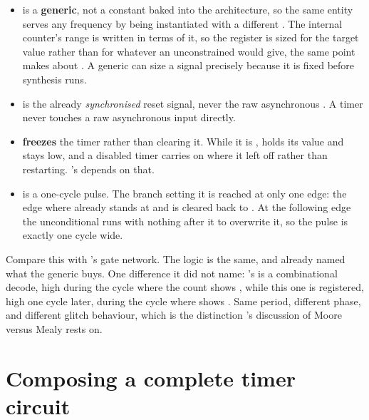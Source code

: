 \begin{itemize}
  \item {} is a \textbf{generic}, not a constant baked into the architecture, so the
    same entity serves any frequency by being instantiated with a different . The
    internal counter's range is written in terms of it, so the register is sized for the target value
    rather than for whatever an unconstrained  would give, the same point
     makes about . A generic can size a signal
    precisely because it is fixed before synthesis runs.
  \item {} is the already \emph{synchronised} reset signal, never the raw
    asynchronous . A timer never touches a raw asynchronous input directly.
  \item {} \textbf{freezes} the timer rather than clearing it. While it is ,
     holds its value and  stays low, and a disabled timer carries on
    where it left off rather than restarting. 's  depends on that.
  \item {} is a one-cycle pulse. The  branch setting it is reached at only
    one edge: the edge where  already stands at  and is cleared back
    to . At the following edge the unconditional  runs with nothing
    after it to overwrite it, so the pulse is exactly one cycle wide.
\end{itemize}

Compare this with 's gate network. The logic is the same, and
 already named what the generic buys. One difference it did not name:
's  is a combinational decode, high during the cycle where the
count shows , while this one is registered, high one cycle later, during the cycle where
 shows . Same period, different phase, and different glitch behaviour, which
is the distinction 's discussion of Moore versus Mealy rests on.

\section{Composing a complete timer circuit}
\label{c7:sec:compose}

